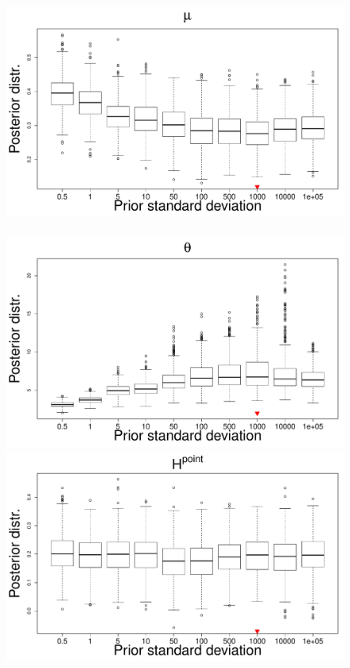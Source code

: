 \documentclass{statsoc}
\numberwithin{figure}{section}
\numberwithin{table}{section}
\begin{document}
\begin{figure}
\centering
\includegraphics[scale=0.25]{Sensitivity/mu_sensitivity.pdf}~
\includegraphics[scale=0.25]{Sensitivity/theta_sensitivity.pdf}\\
\includegraphics[scale=0.25]{Sensitivity/H_point_sensitivity.pdf}~

\end{figure}
\end{document}

